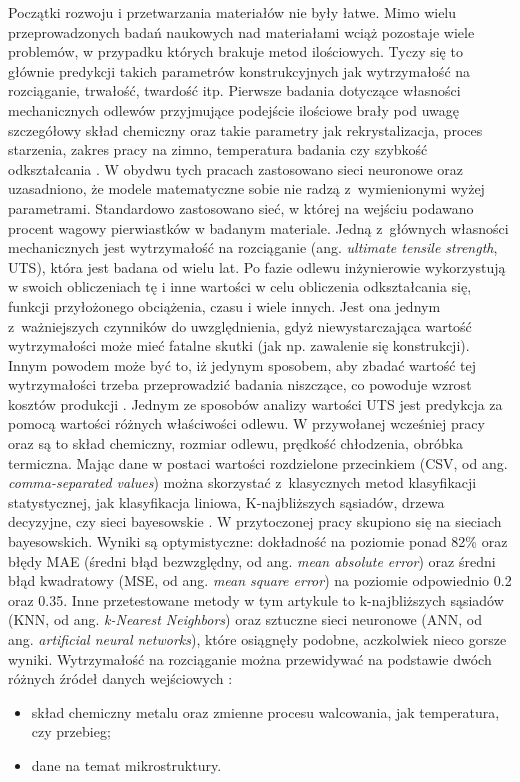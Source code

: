 Początki rozwoju i przetwarzania materiałów nie były łatwe. Mimo wielu przeprowadzonych badań naukowych nad materiałami wciąż pozostaje wiele problemów, w przypadku których brakuje metod ilościowych. Tyczy się to głównie predykcji takich parametrów konstrukcyjnych jak wytrzymałość na rozciąganie, trwałość, twardość itp. Pierwsze badania dotyczące własności mechanicznych odlewów przyjmujące podejście ilościowe brały pod uwagę szczegółowy skład chemiczny oraz takie parametry jak rekrystalizacja, proces starzenia, zakres pracy na zimno, temperatura badania czy szybkość odkształcania \cite{Bhadeshia07, Badmos13}. W obydwu tych pracach zastosowano sieci neuronowe oraz uzasadniono, że modele matematyczne sobie nie radzą z~wymienionymi wyżej parametrami. Standardowo zastosowano sieć, w której na wejściu podawano procent wagowy pierwiastków w badanym materiale. 
Jedną z~głównych własności mechanicznych jest wytrzymałość na rozciąganie (ang. \textit{ultimate tensile strength}, UTS), która jest badana od wielu lat. Po fazie odlewu inżynierowie wykorzystują w swoich obliczeniach tę i inne wartości w celu obliczenia odkształcania się, funkcji przyłożonego obciążenia, czasu i wiele innych. Jest ona jednym z~ważniejszych czynników do uwzględnienia, gdyż niewystarczająca wartość wytrzymałości może mieć fatalne skutki (jak np. zawalenie się konstrukcji). Innym powodem może być to, iż jedynym sposobem, aby zbadać wartość tej wytrzymałości trzeba przeprowadzić badania niszczące, co powoduje wzrost kosztów produkcji \cite{Santos09}. Jednym ze sposobów analizy wartości UTS jest predykcja za pomocą wartości różnych właściwości odlewu. W przywołanej wcześniej pracy \cite{Santos09} oraz \cite{Nieves09} są to skład chemiczny, rozmiar odlewu, prędkość chłodzenia, obróbka termiczna. Mając dane w postaci wartości rozdzielone przecinkiem (CSV, od ang. \textit{comma-separated values}) można skorzystać z~klasycznych metod klasyfikacji statystycznej, jak klasyfikacja liniowa, K-najbliższych sąsiadów, drzewa decyzyjne, czy sieci bayesowskie \cite{wiki:klas.stat}. W przytoczonej pracy skupiono się na sieciach bayesowskich. Wyniki są optymistyczne: dokładność na poziomie ponad 82\% oraz błędy MAE (średni błąd bezwzględny, od ang. \textit{mean absolute error}) oraz średni błąd kwadratowy (MSE, od ang. \textit{mean square error}) na poziomie odpowiednio 0.2 oraz 0.35. Inne przetestowane metody w tym artykule to k-najbliższych sąsiadów (KNN, od ang. \textit{k-Nearest Neighbors}) oraz sztuczne sieci neuronowe (ANN, od ang. \textit{artificial neural networks}), które osiągnęły podobne, aczkolwiek nieco gorsze wyniki. 
Wytrzymałość na rozciąganie można przewidywać na podstawie dwóch różnych źródeł danych wejściowych \cite{Yang16}:
\begin{itemize}
\item
skład chemiczny metalu oraz zmienne procesu walcowania, jak temperatura, czy przebieg;
\item
dane na temat mikrostruktury. 
\end{itemize} 

